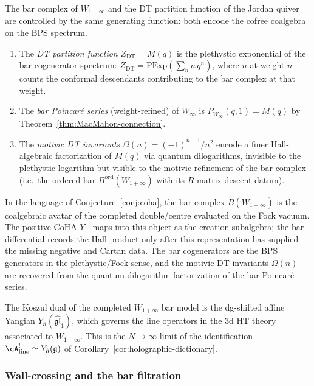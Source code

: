 \begin{remark}
\label{rem:bar-dt-correspondence}
The bar complex of $W_{1+\infty}$ and the DT partition function of
the Jordan quiver are controlled by the same generating function:
both encode the cofree coalgebra on the BPS spectrum.
\begin{enumerate}[label=\textup{(\roman*)}]
\item The \emph{DT partition function} $Z_{\mathrm{DT}} = M(q)$ is the
 plethystic exponential of the bar cogenerator spectrum:
 $Z_{\mathrm{DT}} = \mathrm{PExp}(\sum_n n\, q^n)$, where $n$
 at weight $n$ counts the conformal descendants contributing to
 the bar complex at that weight.
\item The \emph{bar Poincar\'{e} series} (weight-refined) of $W_\infty$
 is $P_{W_\infty}(q,1) = M(q)$ by
 Theorem~\textup{\ref{thm:MacMahon-connection}}.
\item The \emph{motivic DT invariants} $\Omega(n) = (-1)^{n-1}/n^2$
 encode a finer Hall-algebraic factorization of $M(q)$ via quantum
 dilogarithms, invisible to the plethystic logarithm but visible to
 the motivic refinement of the bar complex
 (i.e.\ the ordered bar $B^{\mathrm{ord}}(W_{1+\infty})$ with
 its $R$-matrix descent datum).
\end{enumerate}
In the language of Conjecture~\ref{conj:coha}, the bar complex
$B(W_{1+\infty})$ is the coalgebraic avatar of the completed
double/centre evaluated on the Fock vacuum. The positive CoHA
$Y^+$ maps into this object as the creation subalgebra; the bar
differential records the Hall product only after this representation
has supplied the missing negative and Cartan data. The bar cogenerators
are the BPS generators in the plethystic/Fock sense, and the motivic
DT invariants $\Omega(n)$ are recovered from the quantum-dilogarithm
factorization of the bar Poincar\'{e} series.

The Koszul dual of the completed $W_{1+\infty}$ bar model is the
dg-shifted affine Yangian
$Y_\hbar(\widehat{\mathfrak{gl}}_1)$, which governs the line operators
in the 3d HT theory associated to $W_{1+\infty}$. This is the
$N \to \infty$ limit of the identification
$\cA^!_{\mathrm{line}} \simeq Y_\hbar(\fg)$ of
Corollary~\textup{\ref{cor:holographic-dictionary}}.
\end{remark}

\subsubsection{Wall-crossing and the bar filtration}
\label{subsubsec:wall-crossing-bar}

